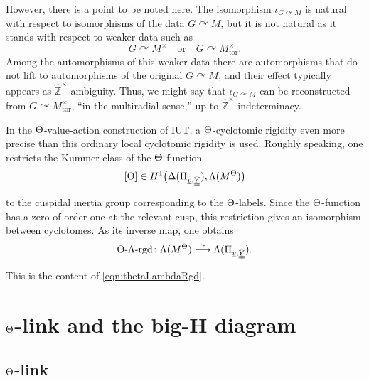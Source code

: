 \documentclass[12pt, reqno, a4paper]{amsart}
\def\udl#1{\underline{#1}} %
\def\what#1{\widehat{#1}} %
\def\simlongto{\stackrel{\sim}{\longrightarrow}} %
\def\acton{\curvearrowright} %
\def\bZ{\mathbb{Z}} %
\def\hbZ{\what{\bZ}} %
\def\uv{\udl{v}} %
\def\tor{\mathrm{tor}}
\begin{document}
However, there is a point to be noted here.
The isomorphism \(\iota_{G\acton M}\) is natural with respect to isomorphisms of the data \(G\acton M\), but it is not natural as it stands with respect to weaker data such as
\[
  G\acton M^{\times}\quad\text{or}\quad G\acton M^{\times}_{\tor}.
\]
Among the automorphisms of this weaker data there are automorphisms that do not lift to automorphisms of the original \(G\acton M\), and their effect typically appears as $\hbZ^{\times}$-ambiguity.
Thus, we might say that \(\iota_{G\acton M}\) can be reconstructed from $G\acton M^{\times}_{\tor}$, ``in the multiradial sense,'' up to \(\hbZ^{\times}\)-indeterminacy. 


In the \(\Th\)-value-action construction of IUT, a \(\Th\)-cyclotomic rigidity even more precise than this ordinary local cyclotomic rigidity is used.
Roughly speaking, one restricts the Kummer class of the \(\Th\)-function
\[
  [\Th]
  \in
  H^1\bigl(\Delta(\Pi_{\uv,\dduuY}),\Lambda(M^{\Th})\bigr)
\]
to the cuspidal inertia group corresponding to the \(\Th\)-labels.
Since the \(\Th\)-function has a zero of order one at the relevant cusp, this restriction gives an isomorphism between cyclotomes.
As its inverse map, one obtains
\[
  \Th\text{-}\Lambda\text{-}\mathrm{rgd}\colon
  \Lambda(M^{\Th})
  \simlongto
  \Lambda(\Pi_{\uv,\dduuY}).
\]
This is the content of \eqref{eqn:thetaLambdaRgd}.


\setcounter{equation}{0}
\section{\(\Th\)-link and the big-H diagram}\label{sec:big-H}

\subsection{\(\Th\)-link}\label{sub:thetaLinkDefinition}
\end{document}
